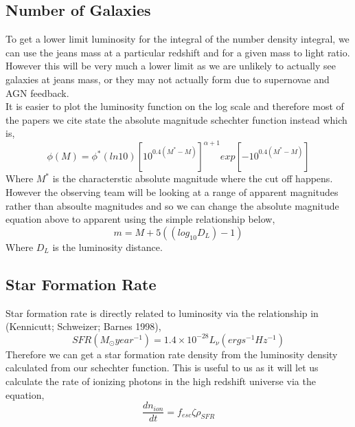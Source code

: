 \documentclass{article}
\begin{document}
\subsection{Number of Galaxies}
To get a lower limit luminosity for the integral of the number density integral, we can use the jeans mass at a particular redshift and for a given mass to light ratio. However this will be very much a lower limit as we are unlikely to actually see galaxies at jeans mass, or they may not actually form due to supernovae and AGN feedback.\\
\indent It is easier to plot the luminosity function on the log scale and therefore most of the papers we cite state the absolute magnitude schechter function instead which is,
\begin{equation}
\phi(M)=\phi^{*}(ln10)\left[10^{0.4(M^{*}-M)}\right]^{\alpha+1}exp\left[-10^{0.4(M^{*}-M)}\right]
\end{equation}
Where $M^{*}$ is the characterstic absolute magnitude where the cut off happens.\\
\indent However the observing team will be looking at a range of apparent magnitudes rather than absoulte magnitudes and so we can change the absolute magnitude equation above to apparent using the simple relationship below,
\begin{equation}
m=M+5((log_{10}D_{L})-1)
\end{equation}
Where $D_{L}$ is the luminosity distance.\\

\subsection{Star Formation Rate}
Star formation rate is directly related to luminosity via the relationship in (Kennicutt; Schweizer; Barnes 1998),
\begin{equation}
SFR(M_{\odot}year^{-1})=1.4\times 10^{-28}L_{\nu}(erg s^{-1}Hz^{-1})
\end{equation}
Therefore we can get a star formation rate density from the luminosity density calculated from our schechter function. This is useful to us as it will let us calculate the rate of ionizing photons in the high redshift universe via the equation,
\begin{equation}
\frac{dn_{ion}}{dt}=f_{esc}\zeta\rho_{SFR}  
\end{equation}
\end{document}
